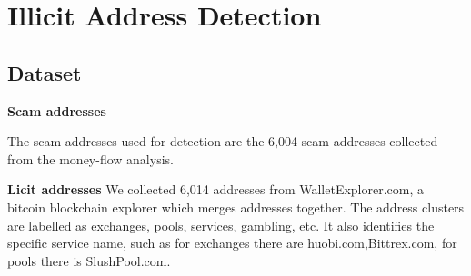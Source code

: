 \section{Illicit Address Detection}


\subsection{Dataset}
\textbf{Scam addresses}

The scam addresses used for detection are the 6,004 scam addresses collected from the money-flow analysis.

\textbf{Licit addresses}
We collected 6,014 addresses from WalletExplorer.com\cite{walletexplorer}, a bitcoin blockchain explorer which merges addresses together. The address clusters are labelled as exchanges, pools, services, gambling, etc. It also identifies the specific service name, such as for exchanges there are huobi.com\cite{huobi},Bittrex.com\cite{bittrex}, for pools there is SlushPool.com\cite{slushpool}.

